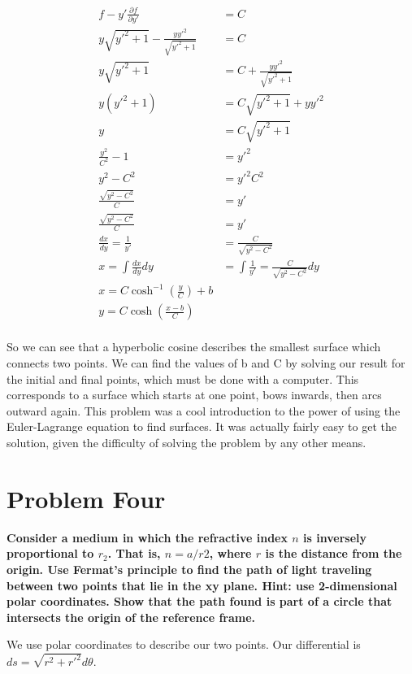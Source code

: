 \documentclass[10pt]{article} %
\begin{document}
\begin{align*}
  f - y'\frac{\partial f}{\partial y'} &= C\\
  y\sqrt{y'^2+1} - \frac{yy'^2}{\sqrt{y'^2+1}} &= C\\
  y\sqrt{y'^2+1} &= C + \frac{yy'^2}{\sqrt{y'^2+1}}\\
  y(y'^2+1) &= C\sqrt{y'^2+1} + yy'^2\\
  y &= C\sqrt{y'^2+1}\\
  \frac{y^2}{C^2} - 1 &= y'^2\\
  y^2 - C^2 &= y'^2C^2\\
  \frac{\sqrt{y^2 - C^2}}{C} &= y'\\
  \frac{\sqrt{y^2 - C^2}}{C} &= y'\\
  \frac{dx}{dy} = \frac{1}{y'} &= \frac{C}{\sqrt{y^2 - C^2}}\\
  x = \int \frac{dx}{dy}dy &= \int \frac{1}{y'} = \frac{C}{\sqrt{y^2 - C^2}}dy\\
  x = C\cosh^{-1}(\frac{y}{C})+b\\
  y = C\cosh(\frac{x-b}{C})\\
\end{align*}

So we can see that a hyperbolic cosine describes the smallest surface which connects two points. We can find the values of b and C by solving our result for the initial and final points, which must be done with a computer. This corresponds to a surface which starts at one point, bows inwards, then arcs outward again. This problem was a cool introduction to the power of using the Euler-Lagrange equation to find surfaces. It was actually fairly easy to get the solution, given the difficulty of solving the problem by any other means.\\

\section{Problem Four}
\textbf{Consider a medium in which the refractive index $n$ is inversely proportional to $r_2$. That is, $n=a/r2$, where $r$ is the distance from the origin. Use Fermat’s principle to find the path of light traveling between two points that lie in the xy plane. Hint: use 2-dimensional polar coordinates. Show that the path found is part of a circle that intersects the origin of the reference frame.}

We use polar coordinates to describe our two points. Our differential is $ds = \sqrt{r^2+r'^2}d\theta$.
\end{document}
